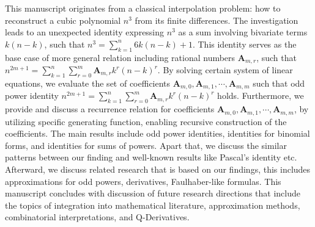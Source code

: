 This manuscript originates from a classical interpolation problem: how to reconstruct a cubic polynomial $n^3$
from its finite differences.
The investigation leads to an unexpected identity expressing $n^3$ as a sum involving bivariate terms $k(n-k)$,
such that $n^3=\sum_{k=1}^{n} 6k(n-k) + 1$.
This identity serves as the base case of more general relation including rational numbers $\mathbf{A}_{m,r}$, such that
$n^{2m+1} = \sum_{k=1}^{n} \sum_{r=0}^{m} \mathbf{A}_{m,r} k^r (n-k)^r$.
By solving certain system of linear equations,
we evaluate the set of coefficients $\mathbf{A}_{m,0}, \mathbf{A}_{m,1}, \cdots, \mathbf{A}_{m,m}$ such that
odd power identity $n^{2m+1} = \sum_{k=1}^{n} \sum_{r=0}^{m} \mathbf{A}_{m,r} k^r (n-k)^r$ holds.
Furthermore, we provide and discuss a recurrence relation
for coefficients $\mathbf{A}_{m,0}, \mathbf{A}_{m,1}, \cdots, \mathbf{A}_{m,m}$, by utilizing
specific generating function, enabling recursive construction of the coefficients.
The main results include odd power identities, identities for binomial forms,
and identities for sums of powers.
Apart that, we discuss the similar patterns between our finding and well-known results like Pascal's identity etc.
Afterward, we discuss related research that is based on our findings, this includes approximations for odd powers,
derivatives, Faulhaber-like formulas.
This manuscript concludes with discussion of future research directions that include
the topics of integration into mathematical literature, approximation methods, combinatorial interpretations,
and Q-Derivatives.
